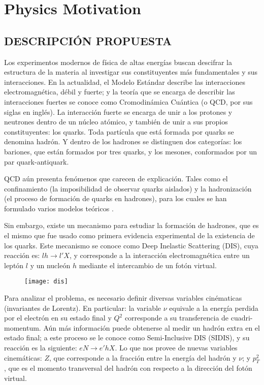 \chapter{Physics Motivation}

\section{DESCRIPCIÓN PROPUESTA}

Los experimentos modernos de física de altas energías buscan descifrar la estructura de la materia al investigar sus constituyentes más fundamentales y sus interacciones. En la actualidad, el Modelo Estándar describe las interacciones electromagnética, débil y fuerte; y la teoría que se encarga de describir las interacciones fuertes se conoce como Cromodinámica Cuántica (o QCD, por sus siglas en inglés). La interacción fuerte se encarga de unir a los protones y neutrones dentro de un núcleo atómico, y también de unir a sus propios constituyentes: los quarks. Toda partícula que está formada por quarks se denomina hadrón. Y dentro de los hadrones se distinguen dos categorías: los bariones, que están formados por tres quarks, y los mesones, conformados por un par quark-antiquark.

QCD aún presenta fenómenos que carecen de explicación. Tales como el confinamiento (la imposibilidad de observar quarks aislados) y la hadronización (el proceso de formación de quarks en hadrones), para los cuales se han formulado varios modelos teóricos \cite{mt1, mt2, mt3}.

Sin embargo, existe un mecanismo para estudiar la formación de hadrones, que es el mismo que fue usado como primera evidencia experimental de la existencia de los quarks. Este mecanismo se conoce como Deep Inelastic Scattering (DIS), cuya reacción es: $l h \rightarrow l' X$, y corresponde a la interacción electromagnética entre un leptón $l$ y un nucleón $h$ mediante el intercambio de un fotón virtual.

\begin{figure}[htp]
    \centering
    \texttt{[image: dis]}
\end{figure}

Para analizar el problema, es necesario definir diversas variables cinématicas (invariantes de Lorentz). En particular: la variable $\nu$ equivale a la energía perdida por el electrón en su estado final y $Q^2$ corresponde a su transferencia de cuadri-momentum. Aún más información puede obtenerse al medir un hadrón extra en el estado final; a este proceso se le conoce como Semi-Inclusive DIS (SIDIS), y su reacción es la siguiente: $e N \rightarrow e' h X$. Lo que nos provee de nuevas variables cinemáticas: $Z$, que corresponde a la fracción entre la energía del hadrón y $\nu$; y $p_T^2$, que es el momento transversal del hadrón con respecto a la dirección del fotón virtual.

